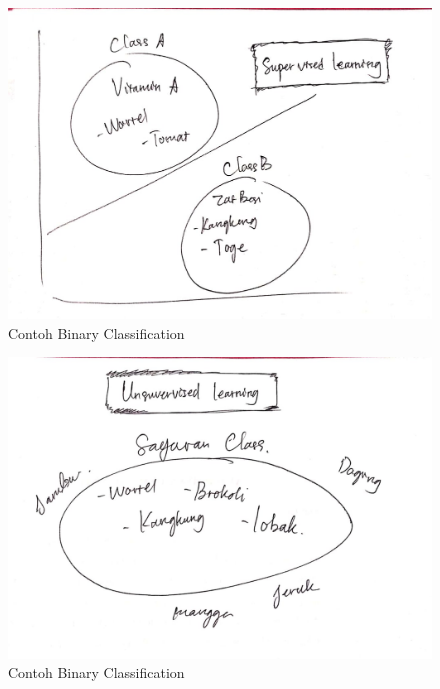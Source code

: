 \begin{figure}[ht]
      \centerline{\includegraphics[width=1\textwidth]
      {figures/c11}}
      \caption{Contoh Binary Classification}
      \label{c11}
      \end{figure}

\begin{figure}[ht]
      \centerline{\includegraphics[width=1\textwidth]
      {figures/c12}}
      \caption{Contoh Binary Classification}
      \label{c12}
      \end{figure}

